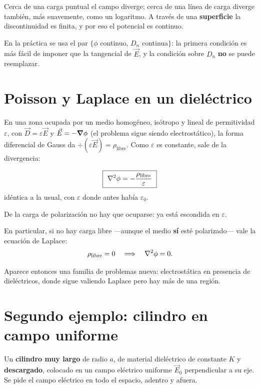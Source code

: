 \documentclass[12pt,a4paper]{article}
\begin{document}
\begin{warnbox}
Cerca de una carga puntual el campo diverge; cerca de una línea de carga diverge
también, más suavemente, como un logaritmo. A través de una \textbf{superficie}
la discontinuidad es finita, y por eso el potencial es continuo.
\end{warnbox}

En la práctica se usa el par $\{\phi$ continuo, $D_n$ continua$\}$: la primera
condición es más fácil de imponer que la tangencial de $\vec E$, y la condición
sobre $D_n$ \textbf{no} se puede reemplazar.

\section{Poisson y Laplace en un dieléctrico}

En una zona ocupada por un medio homogéneo, isótropo y lineal de permitividad
$\varepsilon$, con $\vec D = \varepsilon \vec E$ y $\vec E = -\grad \phi$ (el
problema sigue siendo electrostático), la forma diferencial de Gauss da
$\div(\varepsilon \vec E) = \rho_{\text{libre}}$. Como $\varepsilon$ es
constante, sale de la divergencia:

\begin{keybox}
\[
\boxed{\ \laplacian \phi = -\frac{\rho_{\text{libre}}}{\varepsilon}\ }
\]
idéntica a la usual, con $\varepsilon$ donde antes había $\varepsilon_0$.
\end{keybox}

\begin{notebox}
De la carga de polarización no hay que ocuparse: ya está escondida en
$\varepsilon$.
\end{notebox}

En particular, si no hay carga libre ---aunque el medio \textbf{sí} esté
polarizado--- vale la ecuación de Laplace:
\[
\rho_{\text{libre}} = 0 \quad\Longrightarrow\quad \laplacian \phi = 0 .
\]

Aparece entonces una familia de problemas nueva: electrostática en presencia de
dieléctricos, donde sigue valiendo Laplace pero hay más de una región.

\section{Segundo ejemplo: cilindro en campo uniforme}

Un \textbf{cilindro muy largo} de radio $a$, de material dieléctrico de constante
$K$ y \textbf{descargado}, colocado en un campo eléctrico uniforme $\vec E_0$
perpendicular a su eje. Se pide el campo eléctrico en todo el espacio, adentro y
afuera.
\end{document}
